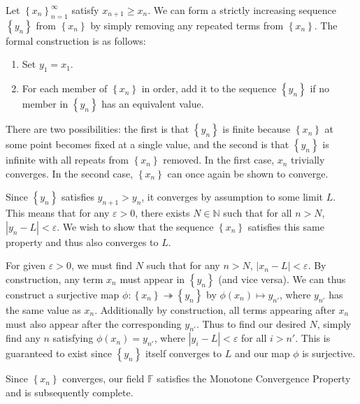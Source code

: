 \documentclass[10pt]{amsart}
\theoremstyle{plain}
\theoremstyle{definition}
\newcommand{\<}{\langle}
\renewcommand{\>}{\rangle}
\begin{document}
Let $\left\{ x_n \right\}_{n=1}^\infty$ satisfy $x_{n+1} \geq x_n$. We can form a strictly increasing sequence $\left\{ y_n \right\}$ from $\left\{ x_n \right\}$ by simply removing any repeated terms from $\left\{ x_n \right\}$. The formal construction is as follows:
\begin{enumerate}
	\item Set $y_1 = x_1$.
	\item For each member of $\left\{ x_n \right\}$ in order, add it to the sequence $\left\{ y_n \right\}$ if no member in $\left\{ y_n \right\}$ has an equivalent value.
\end{enumerate}
There are two possibilities: the first is that $\left\{ y_n \right\}$ is finite because $\left\{ x_n \right\}$ at some point becomes fixed at a single value, and the second is that $\left\{ y_n \right\}$ is infinite with all repeats from  $\left\{ x_n \right\}$ removed. In the first case, $x_n$ trivially converges. In the second case, $\left\{ x_n \right\}$ can once again be shown to converge.

Since $\left\{ y_n \right\}$ satisfies $y_{n+1} > y_n$, it converges by assumption to some limit $L$. This means that for any $\varepsilon > 0$, there exists $N \in \mathbb{N}$ such that for all $n > N$, $|y_n - L| < \varepsilon$. We wish to show that the sequence $\left\{ x_n \right\}$ satisfies this same property and thus also converges to $L$.

For given $\varepsilon > 0$, we must find $N$ such that for any $n > N$, $|x_n - L| < \varepsilon$. By construction, any term $x_n$ must appear in $\left\{ y_n \right\}$ (and vice versa). We can thus construct a surjective map $\phi: \left\{ x_n \right\} \twoheadrightarrow \left\{ y_n \right\}$ by $\phi(x_n) \mapsto y_{n'}$, where $y_{n'}$ has the same value as $x_n$. Additionally by construction, all terms appearing after $x_n$ must also appear after the corresponding $y_{n'}$. Thus to find our desired $N$, simply find any $n$ satisfying $\phi(x_n) = y_{n'}$, where $|y_i - L| < \varepsilon$ for all $i > n'$. This is guaranteed to exist since $\left\{ y_n \right\}$ itself converges to $L$ and our map $\phi$ is surjective.

Since $\left\{ x_n \right\}$ converges, our field $\mathbb{F}$ satisfies the Monotone Convergence Property and is subsequently complete.
\end{document}
